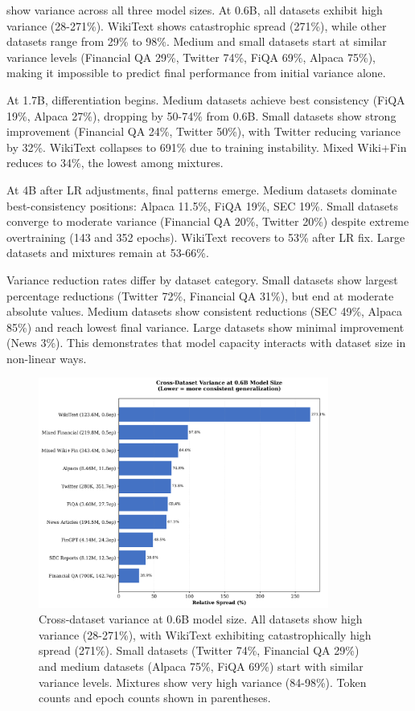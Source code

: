  show variance across all three model sizes. At 0.6B, all datasets exhibit high variance (28-271\%). WikiText shows catastrophic spread (271\%), while other datasets range from 29\% to 98\%. Medium and small datasets start at similar variance levels (Financial QA 29\%, Twitter 74\%, FiQA 69\%, Alpaca 75\%), making it impossible to predict final performance from initial variance alone.

At 1.7B, differentiation begins. Medium datasets achieve best consistency (FiQA 19\%, Alpaca 27\%), dropping by 50-74\% from 0.6B. Small datasets show strong improvement (Financial QA 24\%, Twitter 50\%), with Twitter reducing variance by 32\%. WikiText collapses to 691\% due to training instability. Mixed Wiki+Fin reduces to 34\%, the lowest among mixtures.

At 4B after LR adjustments, final patterns emerge. Medium datasets dominate best-consistency positions: Alpaca 11.5\%, FiQA 19\%, SEC 19\%. Small datasets converge to moderate variance (Financial QA 20\%, Twitter 20\%) despite extreme overtraining (143 and 352 epochs). WikiText recovers to 53\% after LR fix. Large datasets and mixtures remain at 53-66\%.

Variance reduction rates differ by dataset category. Small datasets show largest percentage reductions (Twitter 72\%, Financial QA 31\%), but end at moderate absolute values. Medium datasets show consistent reductions (SEC 49\%, Alpaca 85\%) and reach lowest final variance. Large datasets show minimal improvement (News 3\%). This demonstrates that model capacity interacts with dataset size in non-linear ways.

\begin{figure}[htbp]
\centering
\includegraphics[width=0.85\textwidth]{figures/bar_variance_06b.png}
\caption[Variance at 0.6B Model Size]{Cross-dataset variance at 0.6B model size. All datasets show high variance (28-271\%), with WikiText exhibiting catastrophically high spread (271\%). Small datasets (Twitter 74\%, Financial QA 29\%) and medium datasets (Alpaca 75\%, FiQA 69\%) start with similar variance levels. Mixtures show very high variance (84-98\%). Token counts and epoch counts shown in parentheses.}
\label{fig:bar_variance_06b}
\end{figure}

